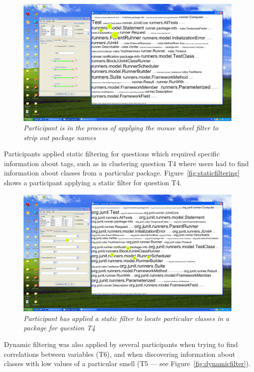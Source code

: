\begin{figure}[!htb]
	\centering
	\includegraphics[scale=0.25]{mousewheelfilter.png}
	\caption{\textit{Participant is in the process of applying the mouse wheel filter to strip out package names}}
	\label{fig:mousewheel}
\end{figure}

Participants applied static filtering for questions which required specific information about tags, such as in clustering question T4 where users had to find information about classes from a particular package. Figure~\vref{fig:staticfiltering} shows a participant applying a static filter for question T4.

\begin{figure}[!htb]
	\centering
	\includegraphics[scale=0.25]{staticfiltering.png}
	\caption{\textit{Participant has applied a static filter to locate particular classes in a package for question T4}}
	\label{fig:staticfiltering}
\end{figure}

Dynamic filtering was also applied by several participants when trying to find correlations between variables (T6), and when discovering information about classes with low values of a particular smell (T5 --- see Figure~\vref{fig:dynamicfilter}). 

